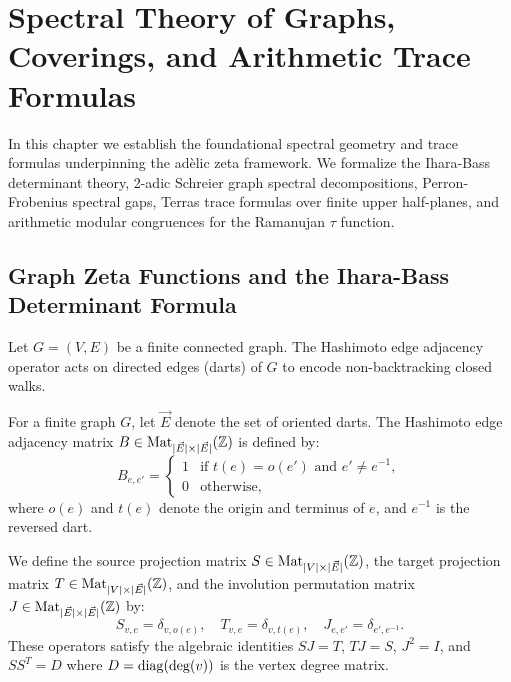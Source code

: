 \chapter{Spectral Theory of Graphs, Coverings, and Arithmetic Trace Formulas}
\label{chap:spectral}

In this chapter we establish the foundational spectral geometry and trace formulas underpinning the adèlic zeta framework. We formalize the Ihara-Bass determinant theory, 2-adic Schreier graph spectral decompositions, Perron-Frobenius spectral gaps, Terras trace formulas over finite upper half-planes, and arithmetic modular congruences for the Ramanujan $\tau$ function.

\section{Graph Zeta Functions and the Ihara-Bass Determinant Formula}

Let $G = (V, E)$ be a finite connected graph. The Hashimoto edge adjacency operator acts on directed edges (darts) of $G$ to encode non-backtracking closed walks.

\begin{definition}
\label{def:hashimoto_matrix}
\leanok
For a finite graph $G$, let $\vec{E}$ denote the set of oriented darts. The Hashimoto edge adjacency matrix $B \in \mathrm{Mat}_{|\vec{E}| \times |\vec{E}|}(\mathbb{Z})$ is defined by:
\[
B_{e, e'} = \begin{cases}
1 & \text{if } t(e) = o(e') \text{ and } e' \neq e^{-1}, \\
0 & \text{otherwise},
\end{cases}
\]
where $o(e)$ and $t(e)$ denote the origin and terminus of $e$, and $e^{-1}$ is the reversed dart.
\end{definition}

\begin{definition}
\label{def:dart_operators}
\leanok
We define the source projection matrix $S \in \mathrm{Mat}_{|V| \times |\vec{E}|}(\mathbb{Z})$, the target projection matrix $T \in \mathrm{Mat}_{|V| \times |\vec{E}|}(\mathbb{Z})$, and the involution permutation matrix $J \in \mathrm{Mat}_{|\vec{E}| \times |\vec{E}|}(\mathbb{Z})$ by:
\[
S_{v, e} = \delta_{v, o(e)}, \quad T_{v, e} = \delta_{v, t(e)}, \quad J_{e, e'} = \delta_{e', e^{-1}}.
\]
These operators satisfy the algebraic identities $S J = T$, $T J = S$, $J^2 = I$, and $S S^T = D$ where $D = \mathrm{diag}(\deg(v))$ is the vertex degree matrix.
\end{definition}

